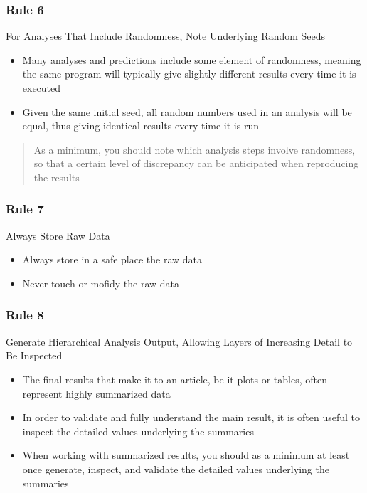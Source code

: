 \documentclass{beamer}
\begin{document}
\begin{frame}
\frametitle{Rule 6}
{\sc For Analyses That Include Randomness, Note Underlying Random Seeds}
\begin{itemize}
    \item Many analyses and predictions include some element of randomness, meaning the same program will typically give slightly different results every time it is executed
    \item Given the same initial seed, all random numbers used in an analysis will be equal, thus giving identical results every time it is run
\end{itemize}
\begin{quote}
    As a minimum, you should note which analysis steps involve randomness, so that a certain level of discrepancy can be anticipated when reproducing the results
\end{quote}
\end{frame}
\begin{frame}
\frametitle{Rule 7}
{\sc Always Store Raw Data}\
\begin{itemize}
    \item Always store in a safe place the raw data
    \item Never touch or mofidy the raw data
\end{itemize}
\end{frame}
\begin{frame}
\frametitle{Rule 8}
{\sc Generate Hierarchical Analysis Output, Allowing Layers of Increasing Detail to Be Inspected}
\begin{itemize}
    \item The final results that make it to an article, be it plots or tables, often represent highly summarized data
    \item In order to validate and fully understand the main result, it is often useful to inspect the detailed values underlying the summaries
    \item When working with summarized results, you should as a minimum at least once generate, inspect, and validate the detailed values underlying the summaries
\end{itemize}

\end{frame}
\end{document}
